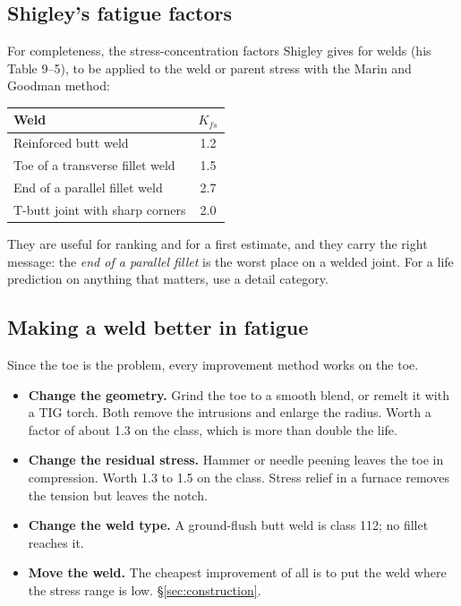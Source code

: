 \documentclass[11pt,a4paper]{article}
\begin{document}
\subsection{Shigley's fatigue factors}

For completeness, the stress-concentration factors Shigley gives for welds (his Table 9--5), to be
applied to the weld or parent stress with the Marin and Goodman method:

\begin{center}\footnotesize
\begin{tabular}{@{}lc@{}}
\toprule
\textbf{Weld} & $K_{fs}$\\
\midrule
Reinforced butt weld & 1.2\\
Toe of a transverse fillet weld & 1.5\\
End of a parallel fillet weld & 2.7\\
T-butt joint with sharp corners & 2.0\\
\bottomrule
\end{tabular}
\end{center}

\noindent They are useful for ranking and for a first estimate, and they carry the right message:
the \emph{end of a parallel fillet} is the worst place on a welded joint. For a life prediction on
anything that matters, use a detail category.

\subsection{Making a weld better in fatigue}

Since the toe is the problem, every improvement method works on the toe.

\begin{itemize}[leftmargin=*,itemsep=2pt]
\item \textbf{Change the geometry.} Grind the toe to a smooth blend, or remelt it with a TIG torch.
  Both remove the intrusions and enlarge the radius. Worth a factor of about 1.3 on the class,
  which is more than double the life.
\item \textbf{Change the residual stress.} Hammer or needle peening leaves the toe in compression.
  Worth 1.3 to 1.5 on the class. Stress relief in a furnace removes the tension but leaves the
  notch.
\item \textbf{Change the weld type.} A ground-flush butt weld is class 112; no fillet reaches it.
\item \textbf{Move the weld.} The cheapest improvement of all is to put the weld where the stress
  range is low. \S\ref{sec:construction}.
\end{itemize}
\end{document}
